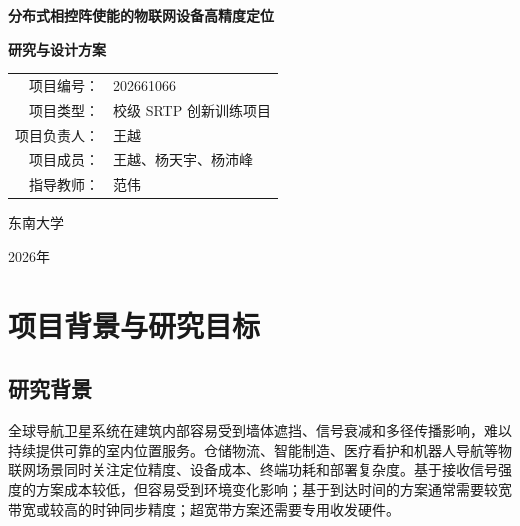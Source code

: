 \documentclass[UTF8,a4paper,12pt]{ctexart}
\begin{document}
\begin{titlepage}
  \centering
  \vspace*{2.2cm}
  {\bfseries 分布式相控阵使能的物联网设备高精度定位\par}
  \vspace{1.1cm}
  {\bfseries 研究与设计方案\par}
  \vfill
  \renewcommand{\arraystretch}{1.6}
  \begin{tabular}{rl}
    项目编号：& 202661066\\
    项目类型：& 校级 SRTP 创新训练项目\\
    项目负责人：& 王越\\
    项目成员：& 王越、杨天宇、杨沛峰\\
    指导教师：& 范伟\\
  \end{tabular}
  \vfill
  {东南大学\par}
  \vspace{0.5cm}
  {2026年\par}
\end{titlepage}

\tableofcontents
\clearpage
{}

\begin{abstract}
本项目面向室内物联网终端定位，研究以多个分布式相控阵阵位为基础、以幅度或功率观测代替逐通道直接相位测量的定位方案。系统通过受控改变阵元相位，利用旋转电场矢量法（REV）从阵列合成功率变化中恢复阵元相对复响应；随后使用多重信号分类（MUSIC）和常规波束形成估计每个阵位的信号到达方向，并结合阵位坐标完成多阵位联合定位。研究采用分层验证路线：MATLAB用于验证算法模型和参数影响，FEKO用于引入天线、材料和电磁传播因素，实物实验用于检验测量、复响应恢复、测向和定位的完整链路。本文给出系统组成、算法模型以及各验证阶段的实际设计，不包含后续实验结果。

\noindent\textbf{关键词：}分布式相控阵；功率测量；REV；DOA；AOA定位；MUSIC；常规波束形成
\end{abstract}

\section{项目背景与研究目标}

\subsection{研究背景}

全球导航卫星系统在建筑内部容易受到墙体遮挡、信号衰减和多径传播影响，难以持续提供可靠的室内位置服务。仓储物流、智能制造、医疗看护和机器人导航等物联网场景同时关注定位精度、设备成本、终端功耗和部署复杂度。基于接收信号强度的方案成本较低，但容易受到环境变化影响；基于到达时间的方案通常需要较宽带宽或较高的时钟同步精度；超宽带方案还需要专用收发硬件。
\end{document}
